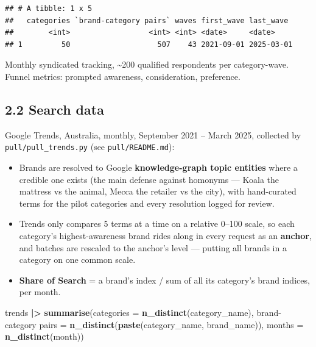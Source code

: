 \documentclass[
]{article}
\newenvironment{Shaded}{\begin{snugshade}}{\end{snugshade}}
\newcommand{\AttributeTok}[1]{\textcolor[rgb]{0.13,0.29,0.53}{#1}}
\newcommand{\FunctionTok}[1]{\textcolor[rgb]{0.13,0.29,0.53}{\textbf{#1}}}
\newcommand{\NormalTok}[1]{#1}
\newcommand{\OtherTok}[1]{\textcolor[rgb]{0.56,0.35,0.01}{#1}}
\newcommand{\SpecialCharTok}[1]{\textcolor[rgb]{0.81,0.36,0.00}{\textbf{#1}}}
\newcommand{\StringTok}[1]{\textcolor[rgb]{0.31,0.60,0.02}{#1}}
\providecommand{\tightlist}{%
  \setlength{\itemsep}{0pt}\setlength{\parskip}{0pt}}
\begin{document}
\begin{verbatim}
## # A tibble: 1 x 5
##   categories `brand-category pairs` waves first_wave last_wave 
##        <int>                  <int> <int> <date>     <date>    
## 1         50                    507    43 2021-09-01 2025-03-01
\end{verbatim}

Monthly syndicated tracking, \textasciitilde200 qualified respondents
per category-wave. Funnel metrics: prompted awareness, consideration,
preference.

\hypertarget{search-data}{%
\subsection{2.2 Search data}\label{search-data}}

Google Trends, Australia, monthly, September 2021 -- March 2025,
collected by \texttt{pull/pull\_trends.py} (see
\texttt{pull/README.md}):

\begin{itemize}
\tightlist
\item
  Brands are resolved to Google \textbf{knowledge-graph topic entities}
  where a credible one exists (the main defense against homonyms ---
  Koala the mattress vs the animal, Mecca the retailer vs the city),
  with hand-curated terms for the pilot categories and every resolution
  logged for review.
\item
  Trends only compares 5 terms at a time on a relative 0--100 scale, so
  each category's highest-awareness brand rides along in every request
  as an \textbf{anchor}, and batches are rescaled to the anchor's level
  --- putting all brands in a category on one common scale.
\item
  \textbf{Share of Search} = a brand's index / sum of all its category's
  brand indices, per month.
\end{itemize}

\begin{Shaded}
\begin{Highlighting}[]
\NormalTok{trends }\SpecialCharTok{|\textgreater{}}
  \FunctionTok{summarise}\NormalTok{(}\AttributeTok{categories =} \FunctionTok{n\_distinct}\NormalTok{(category\_name),}
            \StringTok{\textasciigrave{}}\AttributeTok{brand{-}category pairs}\StringTok{\textasciigrave{}} \OtherTok{=} \FunctionTok{n\_distinct}\NormalTok{(}\FunctionTok{paste}\NormalTok{(category\_name, brand\_name)),}
            \AttributeTok{months =} \FunctionTok{n\_distinct}\NormalTok{(month))}
\end{Highlighting}
\end{Shaded}
\end{document}
